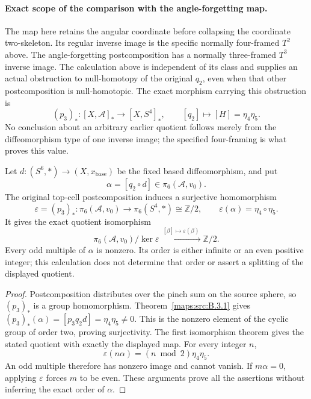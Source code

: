 \paragraph{Exact scope of the comparison with the angle-forgetting map.}
The map here retains the angular coordinate before collapsing the
coordinate two-skeleton.  Its regular inverse image is the specific
normally four-framed \(T^2\) above.  The angle-forgetting
postcomposition has a normally three-framed \(T^3\) inverse image.
The calculation above is independent of its class and supplies an
actual obstruction to null-homotopy of the original \(q_2\), even
when that other postcomposition is null-homotopic.  The exact
morphism carrying this obstruction is
\[
 (p_3)_*:[X,\mathcal A]_*\longrightarrow[X,S^4]_*,\qquad
 [q_2]\longmapsto[H]=\eta_4\eta_5.
\]
No conclusion about an arbitrary earlier quotient follows merely
from the diffeomorphism type of one inverse image; the specified
four-framing is what proves this value.

\begin{corollary}
\label{wb:h24:ret:q2-detected-quotient}
Let \(d:(S^6,*)\to(X,x_{\mathrm{base}})\) be the fixed based
diffeomorphism, and put
\[
\alpha=[q_2\circ d]\in\pi_6(\mathcal A,v_0).
\]
The original top-cell postcomposition induces a surjective homomorphism
\[
\varepsilon=(p_3)_*:\pi_6(\mathcal A,v_0)
  \longrightarrow\pi_6(S^4,*)\cong\mathbb Z/2,
\qquad \varepsilon(\alpha)=\eta_4\circ\eta_5.
\]
It gives the exact quotient isomorphism
\[
\pi_6(\mathcal A,v_0)/\ker\varepsilon
 \xrightarrow{\ [\beta]\mapsto\varepsilon(\beta)\ }
\mathbb Z/2.
\]
Every odd multiple of \(\alpha\) is nonzero. Its order is either
infinite or an even positive integer; this calculation does not determine
that order or assert a splitting of the displayed quotient.
\end{corollary}
\begin{proof}
Postcomposition distributes over the pinch sum on the source sphere,
so \((p_3)_*\) is a group homomorphism. Theorem~\ref{maps:src:B.3.1}
gives \((p_3)_*(\alpha)=[p_3q_2d]=\eta_4\eta_5\ne0\).
This is the nonzero element of the cyclic group of order two, proving
surjectivity. The first isomorphism theorem gives the stated quotient
with exactly the displayed map. For every integer \(n\),
\[
\varepsilon(n\alpha)=(n\bmod2)\eta_4\eta_5.
\]
An odd multiple therefore has nonzero image and cannot vanish.
If \(m\alpha=0\), applying \(\varepsilon\) forces \(m\)
to be even. These arguments prove all the assertions without inferring
the exact order of \(\alpha\).
\end{proof}


